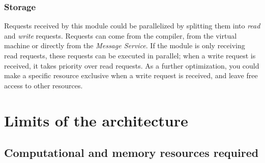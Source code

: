 \subsubsection{Storage}

Requests received by this module could be parallelized by splitting them into \textit{read} and 
\textit{write} requests. Requests can come from the compiler, from the virtual machine or directly from the 
\textit{Message Service}. If the module is only receiving read requests, these requests can be executed in 
parallel; when a write request is received, it takes priority over read requests. As a further optimization, 
you could make a specific resource exclusive when a write request is received, and leave free access to 
other resources.

\section{Limits of the architecture}

\subsection{Computational and memory resources required}

